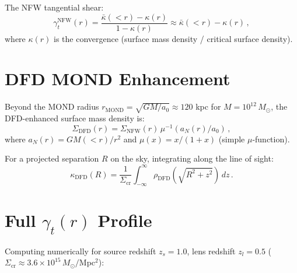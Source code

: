 \documentclass[11pt,a4paper]{article}
\begin{document}
The NFW tangential shear:
\begin{equation}
\gamma_t^{\mathrm{NFW}}(r) = \frac{\bar{\kappa}(< r) - \kappa(r)}{1 - \kappa(r)} \approx \bar{\kappa}(< r) - \kappa(r)\,,
\end{equation}
where $\kappa(r)$ is the convergence (surface mass density / critical surface density).

\section{DFD MOND Enhancement}

Beyond the MOND radius $r_{\mathrm{MOND}} = \sqrt{GM/a_0} \approx 120$ kpc for $M = 10^{12}\,M_\odot$, the DFD-enhanced surface mass density is:
\begin{equation}
\Sigma_{\mathrm{DFD}}(r) = \Sigma_{\mathrm{NFW}}(r)\,\mu^{-1}(a_N(r)/a_0)\,,
\end{equation}
where $a_N(r) = GM(< r)/r^2$ and $\mu(x) = x/(1+x)$ (simple $\mu$-function).

For a projected separation $R$ on the sky, integrating along the line of sight:
\begin{equation}
\kappa_{\mathrm{DFD}}(R) = \frac{1}{\Sigma_{\mathrm{cr}}}\int_{-\infty}^{\infty}\rho_{\mathrm{DFD}}(\sqrt{R^2 + z^2})\,dz\,.
\end{equation}

\section{Full $\gamma_t(r)$ Profile}

Computing numerically for source redshift $z_s = 1.0$, lens redshift $z_l = 0.5$ ($\Sigma_{\mathrm{cr}} \approx 3.6 \times 10^{15}\,M_\odot/$Mpc$^2$):
\end{document}
